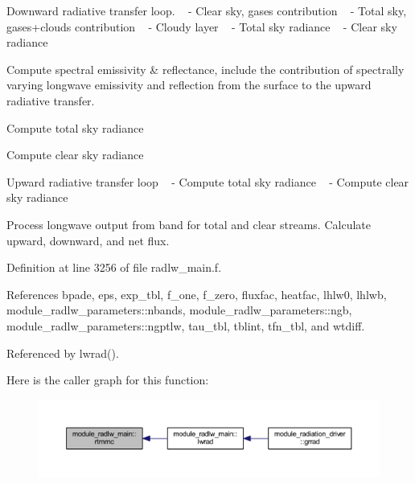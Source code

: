 \begin{DoxyEnumerate}
\item Downward radiative transfer loop. ~\newline
 -\/ Clear sky, gases contribution ~\newline
 -\/ Total sky, gases+clouds contribution ~\newline
 -\/ Cloudy layer ~\newline
 -\/ Total sky radiance ~\newline
 -\/ Clear sky radiance
\item Compute spectral emissivity \& reflectance, include the contribution of spectrally varying longwave emissivity and reflection from the surface to the upward radiative transfer.
\item Compute total sky radiance
\item Compute clear sky radiance
\item Upward radiative transfer loop ~\newline
 -\/ Compute total sky radiance ~\newline
 -\/ Compute clear sky radiance
\item Process longwave output from band for total and clear streams. Calculate upward, downward, and net flux. 
\end{DoxyEnumerate}

Definition at line 3256 of file radlw\+\_\+main.\+f.



References bpade, eps, exp\+\_\+tbl, f\+\_\+one, f\+\_\+zero, fluxfac, heatfac, lhlw0, lhlwb, module\+\_\+radlw\+\_\+parameters\+::nbands, module\+\_\+radlw\+\_\+parameters\+::ngb, module\+\_\+radlw\+\_\+parameters\+::ngptlw, tau\+\_\+tbl, tblint, tfn\+\_\+tbl, and wtdiff.



Referenced by lwrad().



Here is the caller graph for this function\+:\nopagebreak
\begin{figure}[H]
\begin{center}
\leavevmode
\includegraphics[width=350pt]{namespacemodule__radlw__main_a51d42f46321972ffdca4880185506ac5_icgraph}
\end{center}
\end{figure}


